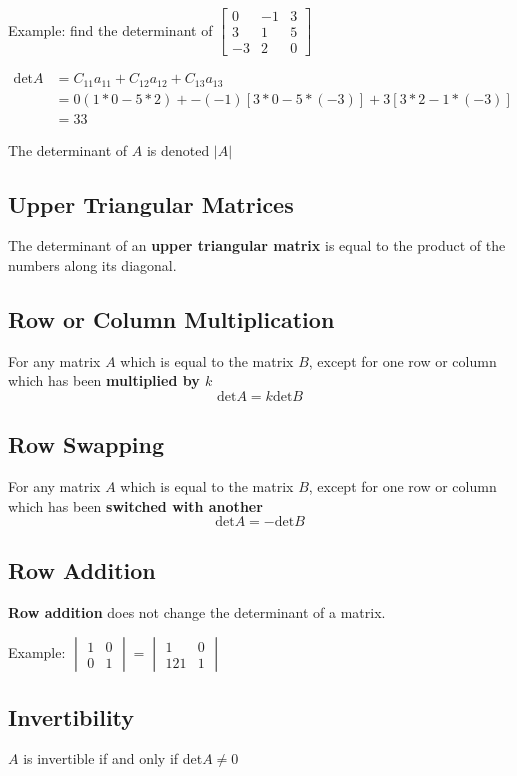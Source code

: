 \documentclass[12pt]{article}
\begin{document}
Example: find the determinant of $\begin{bmatrix}0&-1&3\\3&1&5\\-3&2&0\end{bmatrix}$

\begin{align*}
\text{det}A &= C_{11}a_{11} + C_{12}a_{12} + C_{13}a_{13}\\
&= 0(1*0-5*2) + -(-1)[3*0-5*(-3)] + 3[3*2-1*(-3)]\\
&= 33
\end{align*}

The determinant of $A$ is denoted $|A|$

\subsection*{Upper Triangular Matrices}
The determinant of an {\bf upper triangular matrix} is equal to the product of the numbers along its diagonal.

\subsection*{Row or Column Multiplication}
For any matrix $A$ which is equal to the matrix $B$, except for one row or column which has been {\bf multiplied by $k$} \[ \text{det}A = k\text{det}B \]

\subsection*{Row Swapping}
For any matrix $A$ which is equal to the matrix $B$, except for one row or column which has been {\bf switched with another} \[ \text{det}A = -\text{det}B \]

\subsection*{Row Addition}
{\bf Row addition} does not change the determinant of a matrix.

Example: $\begin{vmatrix}1&0\\0&1\end{vmatrix} = \begin{vmatrix}1&0\\121&1\end{vmatrix}$

\subsection*{Invertibility}
\begin{theorem}
$A$ is invertible if and only if det$A \neq 0$
\end{theorem}
\end{document}
